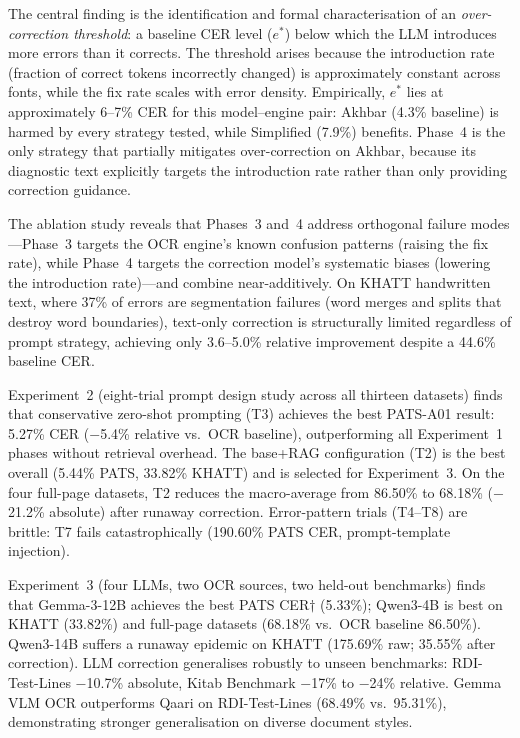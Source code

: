 The central finding is the identification and formal characterisation of an
\emph{over-correction threshold}: a baseline CER level ($e^*$) below which the
LLM introduces more errors than it corrects. The threshold arises because the
introduction rate (fraction of correct tokens incorrectly changed) is
approximately constant across fonts, while the fix rate scales with error
density. Empirically, $e^*$ lies at approximately 6--7\% CER for this
model--engine pair: Akhbar (4.3\% baseline) is harmed by every strategy
tested, while Simplified (7.9\%) benefits. Phase~4 is the only strategy that
partially mitigates over-correction on Akhbar, because its diagnostic text
explicitly targets the introduction rate rather than only providing correction
guidance.

The ablation study reveals that Phases~3 and~4 address orthogonal failure
modes---Phase~3 targets the OCR engine's known confusion patterns (raising the
fix rate), while Phase~4 targets the correction model's systematic biases
(lowering the introduction rate)---and combine near-additively. On KHATT
handwritten text, where 37\% of errors are segmentation failures (word merges
and splits that destroy word boundaries), text-only correction is structurally
limited regardless of prompt strategy, achieving only 3.6--5.0\% relative
improvement despite a 44.6\% baseline CER.

Experiment~2 (eight-trial prompt design study across all thirteen datasets)
finds that conservative zero-shot prompting (T3) achieves the best PATS-A01
result: 5.27\% CER ($-$5.4\% relative vs.\ OCR baseline), outperforming all
Experiment~1 phases without retrieval overhead. The base+RAG configuration
(T2) is the best overall (5.44\% PATS, 33.82\% KHATT) and is selected for
Experiment~3. On the four full-page datasets, T2 reduces the macro-average
from 86.50\% to 68.18\% ($-$21.2\% absolute) after runaway correction.
Error-pattern trials (T4--T8) are brittle: T7 fails catastrophically
(190.60\% PATS CER, prompt-template injection).

Experiment~3 (four LLMs, two OCR sources, two held-out benchmarks) finds
that Gemma-3-12B achieves the best PATS CER$\dagger$ (5.33\%); Qwen3-4B
is best on KHATT (33.82\%) and full-page datasets (68.18\% vs.\ OCR
baseline 86.50\%). Qwen3-14B suffers a runaway epidemic on KHATT (175.69\%
raw; 35.55\% after correction). LLM correction generalises robustly to
unseen benchmarks: RDI-Test-Lines $-$10.7\% absolute, Kitab Benchmark
$-$17\% to $-$24\% relative. Gemma VLM OCR outperforms Qaari on
RDI-Test-Lines (68.49\% vs.\ 95.31\%), demonstrating stronger generalisation
on diverse document styles.

